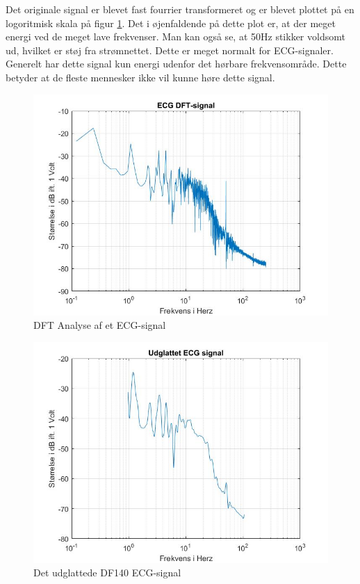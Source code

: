 Det originale signal er blevet fast fourrier transformeret og er blevet plottet på en logoritmisk skala på figur \ref{fig:ECG DFT}. Det i øjenfaldende på dette plot er, at der meget energi ved de meget lave frekvenser. Man kan også se, at 50Hz stikker voldsomt ud, hvilket er støj fra strømnettet. Dette er meget normalt for ECG-signaler. Generelt har dette signal kun energi udenfor det hørbare frekvensområde. Dette betyder at de fleste mennesker ikke vil kunne høre dette signal.
\begin{figure}[H]
	\centering
	\includegraphics[width=120mm]{figures/ECG/DFT.jpg}
	\caption{DFT Analyse af et ECG-signal}
	\label{fig:ECG DFT}
\end{figure}


\begin{figure}[H]
	\centering
	\includegraphics[width=120mm]{figures/ECG/udglattet.jpg}
	\caption{Det udglattede DF140 ECG-signal}
	\label{fig:ECG udglattet}
\end{figure}

